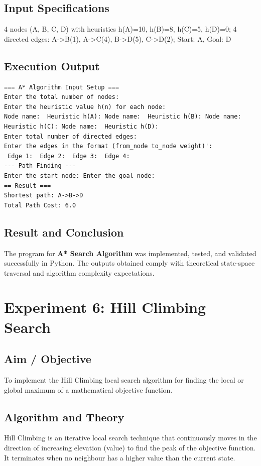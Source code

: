 \documentclass[11pt,a4paper]{report}
\begin{document}
\section{Input Specifications}
4 nodes (A, B, C, D) with heuristics h(A)=10, h(B)=8, h(C)=5, h(D)=0; 4 directed edges: A->B(1), A->C(4), B->D(5), C->D(2); Start: A, Goal: D

\section{Execution Output}
\begin{tcolorbox}[colback=outputback,colframe=outputframe,title={\textbf{Terminal Output - A* Search Algorithm}}]
\begin{verbatim}
=== A* Algorithm Input Setup ===
Enter the total number of nodes: 
Enter the heuristic value h(n) for each node:
Node name:  Heuristic h(A): Node name:  Heuristic h(B): Node name:  Heuristic h(C): Node name:  Heuristic h(D): 
Enter total number of directed edges:
Enter the edges in the format (from_node to_node weight)':
 Edge 1:  Edge 2:  Edge 3:  Edge 4: 
--- Path Finding ---
Enter the start node: Enter the goal node: 
== Result ===
Shortest path: A->B->D
Total Path Cost: 6.0
\end{verbatim}
\end{tcolorbox}

\section{Result and Conclusion}
The program for \textbf{A* Search Algorithm} was implemented, tested, and validated successfully in Python. The outputs obtained comply with theoretical state-space traversal and algorithm complexity expectations.

\newpage

\chapter{Experiment 6: Hill Climbing Search}

\section{Aim / Objective}
To implement the Hill Climbing local search algorithm for finding the local or global maximum of a mathematical objective function.

\section{Algorithm and Theory}
Hill Climbing is an iterative local search technique that continuously moves in the direction of increasing elevation (value) to find the peak of the objective function. It terminates when no neighbour has a higher value than the current state.
\end{document}
